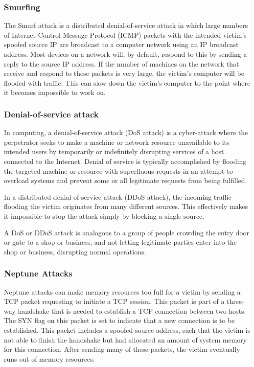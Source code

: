 \documentclass[12pt]{article}
\theoremstyle{definition}
\begin{document}
			\subsubsection{Smurfing}
			The Smurf attack is a distributed denial-of-service attack in which large numbers of Internet Control Message Protocol (ICMP) packets with the intended victim's spoofed source IP are broadcast to a computer network using an IP broadcast address. Most devices on a network will, by default, respond to this by sending a reply to the source IP address. If the number of machines on the network that receive and respond to these packets is very large, the victim's computer will be flooded with traffic. This can slow down the victim's computer to the point where it becomes impossible to work on.
			
			
			\subsubsection{Denial-of-service attack}
			In computing, a denial-of-service attack (DoS attack) is a cyber-attack where the perpetrator seeks to make a machine or network resource unavailable to its intended users by temporarily or indefinitely disrupting services of a host connected to the Internet. Denial of service is typically accomplished by flooding the targeted machine or resource with superfluous requests in an attempt to overload systems and prevent some or all legitimate requests from being fulfilled.
			
			In a distributed denial-of-service attack (DDoS attack), the incoming traffic flooding the victim originates from many different sources. This effectively makes it impossible to stop the attack simply by blocking a single source.
			
			A DoS or DDoS attack is analogous to a group of people crowding the entry door or gate to a shop or business, and not letting legitimate parties enter into the shop or business, disrupting normal operations.
			
			\subsubsection{Neptune Attacks}
			
			Neptune attacks can make memory resources too
			full for a victim by sending a TCP packet requesting  to  initiate a TCP session. This  packet is part of a three-way handshake that is needed to establish a TCP connection between  two  hosts. The SYN flag on this packet is set  to  indicate that a new connection is  to  be  established. This packet includes  a spoofed  source  address, such that the victim is not able to finish the handshake but  had allocated  an  amount of system memory for this connection. After sending many of these packets, the victim eventually runs out of memory resources.
			
\end{document}
